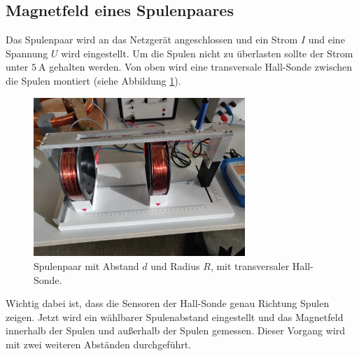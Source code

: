 \subsection{Magnetfeld eines Spulenpaares}
Das Spulenpaar wird an das Netzgerät angeschlossen und ein Strom $I$ und eine Spannung $U$ wird eingestellt.
Um die Spulen nicht zu überlasten sollte der Strom unter $\SI{5}{\ampere}$ gehalten werden.
Von oben wird eine transversale Hall-Sonde zwischen die Spulen montiert (siehe Abbildung \ref{fig:spulenpaar}).
\begin{figure}
    \centering
    \includegraphics[height=6cm]{content/spulenpaar.jpg}
    \caption{Spulenpaar mit Abstand $d$ und Radius $R$, mit transversaler Hall-Sonde.}
    \label{fig:spulenpaar}
\end{figure}
\FloatBarrier
Wichtig dabei ist, dass die Sensoren der Hall-Sonde genau Richtung Spulen zeigen.
Jetzt wird ein wählbarer Spulenabstand eingestellt und das Magnetfeld innerhalb der Spulen und außerhalb der Spulen gemessen.
Dieser Vorgang wird mit zwei weiteren Abständen durchgeführt.

